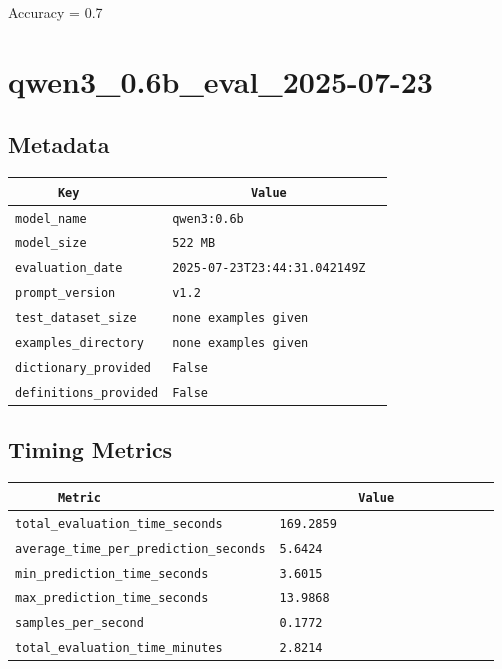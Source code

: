 \documentclass{article}
\begin{document}
\begin{center}
Accuracy = 0.7
\end{center}

\section{qwen3\_0.6b\_eval\_2025-07-23}
\subsection{Metadata}

\begin{center}
\begin{tabular}{l | l} \hline
    \verb|      Key      | & \verb|           Value           | \\ \hline
    \hline
    \verb|model_name    | & \verb|qwen3:0.6b                   | \\ \hline
    \verb|model_size    | & \verb|522 MB                       | \\ \hline
    \verb|evaluation_date| & \verb|2025-07-23T23:44:31.042149Z  | \\ \hline
    \verb|prompt_version| & \verb|v1.2                         | \\ \hline
    \verb|test_dataset_size| & \verb|none examples given          | \\ \hline
    \verb|examples_directory| & \verb|none examples given          | \\ \hline
    \verb|dictionary_provided| & \verb|False                        | \\ \hline
    \verb|definitions_provided| & \verb|False                        | \\ \hline
\end{tabular}
\end{center}

\subsection{Timing Metrics}

\begin{center}
\begin{tabular}{l | l} \hline
    \verb|      Metric     | & \verb|           Value           | \\ \hline
    \hline
    \verb|total_evaluation_time_seconds| & \verb|169.2859                     | \\ \hline
    \verb|average_time_per_prediction_seconds| & \verb|5.6424                       | \\ \hline
    \verb|min_prediction_time_seconds| & \verb|3.6015                       | \\ \hline
    \verb|max_prediction_time_seconds| & \verb|13.9868                      | \\ \hline
    \verb|samples_per_second| & \verb|0.1772                       | \\ \hline
    \verb|total_evaluation_time_minutes| & \verb|2.8214                       | \\ \hline
\end{tabular}
\end{center}
\end{document}

